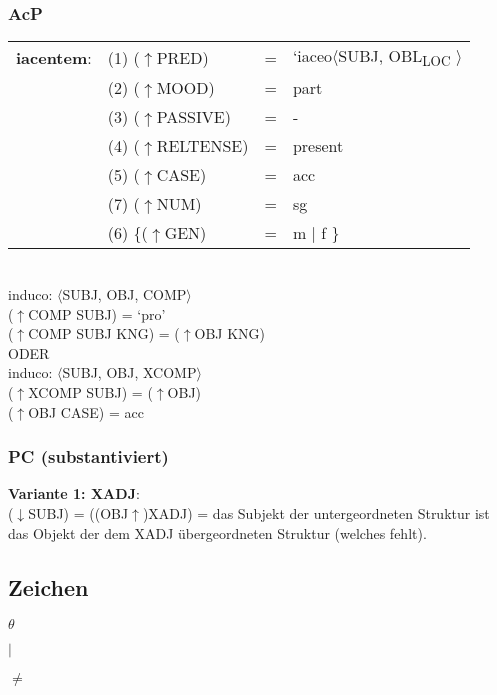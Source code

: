 \documentclass[12pt,a4paper]{article}
\begin{document}
\subsubsection{AcP}

\begin{tabular}{ l  l  l  l  } 
\textbf{iacentem}: & (1) ($\uparrow$PRED) & = & `iaceo$\langle$SUBJ, OBL\textsubscript{LOC} $\rangle$\\
$\qquad$ & (2) ($\uparrow$MOOD) & = & part\\
$\qquad$ & (3) ($\uparrow$PASSIVE) & = & - \\
$\qquad$ & (4) ($\uparrow$RELTENSE) & = & present \\
$\qquad$ & (5) ($\uparrow$CASE) & = & acc \\
$\qquad$ & (7) ($\uparrow$NUM) & = & sg \\
$\qquad$ & (6) \{($\uparrow$GEN) & = & m $\mid$ f \} \\
\end{tabular}\\
\newline
\newline
induco: $\langle$SUBJ, OBJ, COMP$\rangle$\\
($\uparrow$COMP SUBJ) = `pro'\\
($\uparrow$COMP SUBJ KNG) = ($\uparrow$OBJ KNG)\\

ODER\\
induco: $\langle$SUBJ, OBJ, XCOMP$\rangle$\\
($\uparrow$XCOMP SUBJ) = ($\uparrow$OBJ)\\
($\uparrow$OBJ CASE) = acc\\

\subsubsection{PC (substantiviert)}
\textbf{Variante 1: XADJ}:\\
($\downarrow$SUBJ) = ((OBJ$\uparrow$)XADJ)
= das Subjekt der untergeordneten Struktur ist das Objekt der dem XADJ übergeordneten Struktur (welches fehlt).


\subsection{Zeichen}

$\theta$

$\mid$

$\neq$
\end{document}
